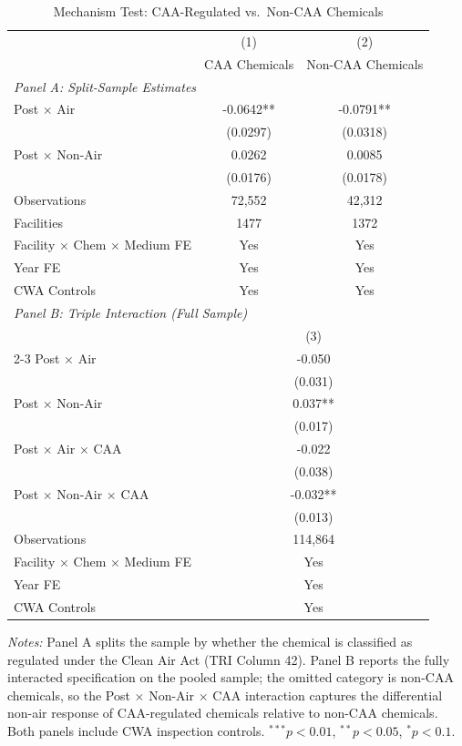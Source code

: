 \begin{table}[htbp]
\centering
\caption{Mechanism Test: CAA-Regulated vs.\ Non-CAA Chemicals}
\label{tab:mechanism}
\begin{tabular}{lcc}
\toprule
& (1) & (2) \\
& CAA Chemicals & Non-CAA Chemicals \\
\midrule
\multicolumn{3}{l}{\textit{Panel A: Split-Sample Estimates}} \\[3pt]
Post $\times$ Air & -0.0642** & -0.0791** \\
& (0.0297) & (0.0318) \\[6pt]
Post $\times$ Non-Air & 0.0262 & 0.0085 \\
& (0.0176) & (0.0178) \\[6pt]
\midrule
Observations & 72,552 & 42,312 \\
Facilities & 1477 & 1372 \\
Facility $\times$ Chem $\times$ Medium FE & Yes & Yes \\
Year FE & Yes & Yes \\
CWA Controls & Yes & Yes \\
\midrule
\multicolumn{3}{l}{\textit{Panel B: Triple Interaction (Full Sample)}} \\[3pt]
& \multicolumn{2}{c}{(3)} \\
\cmidrule(lr){2-3}
Post $\times$ Air & \multicolumn{2}{c}{-0.050} \\
& \multicolumn{2}{c}{(0.031)} \\[3pt]
Post $\times$ Non-Air & \multicolumn{2}{c}{0.037**} \\
& \multicolumn{2}{c}{(0.017)} \\[3pt]
Post $\times$ Air $\times$ CAA & \multicolumn{2}{c}{-0.022} \\
& \multicolumn{2}{c}{(0.038)} \\[3pt]
Post $\times$ Non-Air $\times$ CAA & \multicolumn{2}{c}{-0.032**} \\
& \multicolumn{2}{c}{(0.013)} \\[3pt]
\midrule
Observations & \multicolumn{2}{c}{114,864} \\
Facility $\times$ Chem $\times$ Medium FE & \multicolumn{2}{c}{Yes} \\
Year FE & \multicolumn{2}{c}{Yes} \\
CWA Controls & \multicolumn{2}{c}{Yes} \\
\bottomrule
\end{tabular}
\begin{minipage}{0.95\textwidth}
\vspace{0.3em}
\footnotesize \textit{Notes:} Panel A splits the sample by whether the chemical is classified as regulated under the Clean Air Act (TRI Column 42). Panel B reports the fully interacted specification on the pooled sample; the omitted category is non-CAA chemicals, so the Post $\times$ Non-Air $\times$ CAA interaction captures the differential non-air response of CAA-regulated chemicals relative to non-CAA chemicals. Both panels include CWA inspection controls. $^{***}p<0.01$, $^{**}p<0.05$, $^{*}p<0.1$.
\end{minipage}
\end{table}
